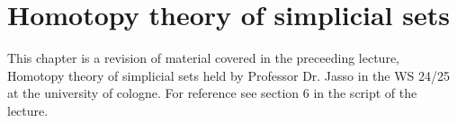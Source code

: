 \section{Homotopy theory of simplicial sets}

This chapter is a revision of material covered in the preceeding lecture,
Homotopy theory of simplicial sets held by Professor Dr. Jasso in the WS 24/25
at the university of cologne.
For reference see section 6 in the script of the lecture.

